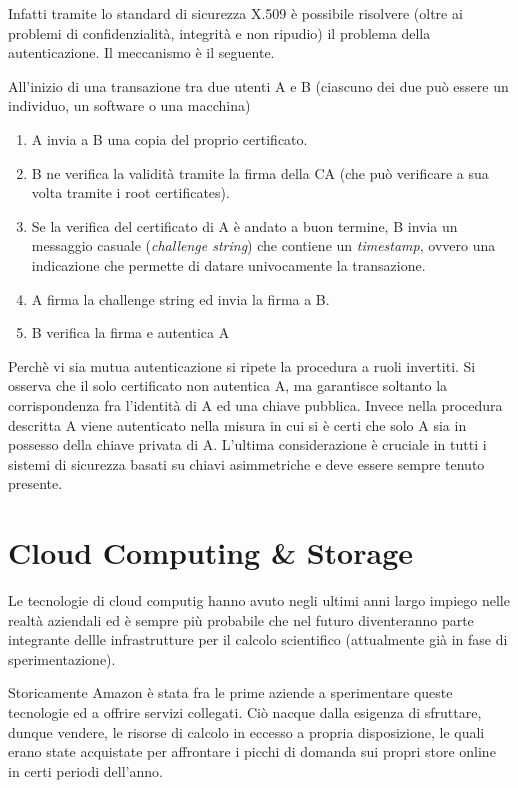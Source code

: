 \documentclass[italian,]{article}
\providecommand{\tightlist}{%
  \setlength{\itemsep}{0pt}\setlength{\parskip}{0pt}}
\begin{document}
Infatti tramite lo standard di sicurezza X.509 è possibile risolvere
(oltre ai problemi di confidenzialità, integrità e non ripudio) il
problema della autenticazione. Il meccanismo è il seguente.

All'inizio di una transazione tra due utenti A e B (ciascuno dei due può
essere un individuo, un software o una macchina)

\begin{enumerate}
\def\labelenumi{\arabic{enumi}.}
\tightlist
\item
  A invia a B una copia del proprio certificato.
\item
  B ne verifica la validità tramite la firma della CA (che può
  verificare a sua volta tramite i root certificates).
\item
  Se la verifica del certificato di A è andato a buon termine, B invia
  un messaggio casuale (\emph{challenge string}) che contiene un
  \emph{timestamp}, ovvero una indicazione che permette di datare
  univocamente la transazione.
\item
  A firma la challenge string ed invia la firma a B.
\item
  B verifica la firma e autentica A
\end{enumerate}

Perchè vi sia mutua autenticazione si ripete la procedura a ruoli
invertiti. Si osserva che il solo certificato non autentica A, ma
garantisce soltanto la corrispondenza fra l'identità di A ed una chiave
pubblica. Invece nella procedura descritta A viene autenticato nella
misura in cui si è certi che solo A sia in possesso della chiave privata
di A. L'ultima considerazione è cruciale in tutti i sistemi di sicurezza
basati su chiavi asimmetriche e deve essere sempre tenuto presente.

\section{Cloud Computing \& Storage}\label{cloud-computing-storage}

Le tecnologie di cloud computig hanno avuto negli ultimi anni largo
impiego nelle realtà aziendali ed è sempre più probabile che nel futuro
diventeranno parte integrante dellle infrastrutture per il calcolo
scientifico (attualmente già in fase di sperimentazione).

Storicamente Amazon è stata fra le prime aziende a sperimentare queste
tecnologie ed a offrire servizi collegati. Ciò nacque dalla esigenza di
sfruttare, dunque vendere, le risorse di calcolo in eccesso a propria
disposizione, le quali erano state acquistate per affrontare i picchi di
domanda sui propri store online in certi periodi dell'anno.
\end{document}
